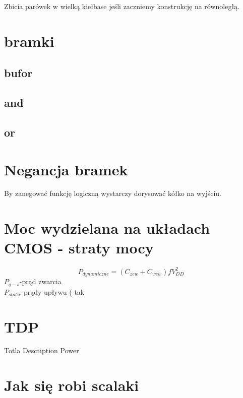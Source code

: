 \documentclass{article}
\begin{document}
Zbicia parówek w wielką kiełbase jeśli zaczniemy konstrukcję na równoległą.
\section{bramki}
\subsection{bufor}
\subsection{and}
\subsection{or}
\section{Negancja bramek}
By zanegować funkcję logiczną wystarczy dorysować kółko na wyjściu.

\section{Moc wydzielana na układach CMOS - straty mocy}
\begin{displaymath}
P_{dynamiczne} = ( C_{zew} + C_{wew} ) f V^2_{DD}
\end{displaymath}
$P_{q-s}$-prąd zwarcia \\
$P_{static}$-prądy upływu ( tak 

\section{TDP}
Totla Desctiption Power

\section{Jak się robi scalaki}
\end{document}
